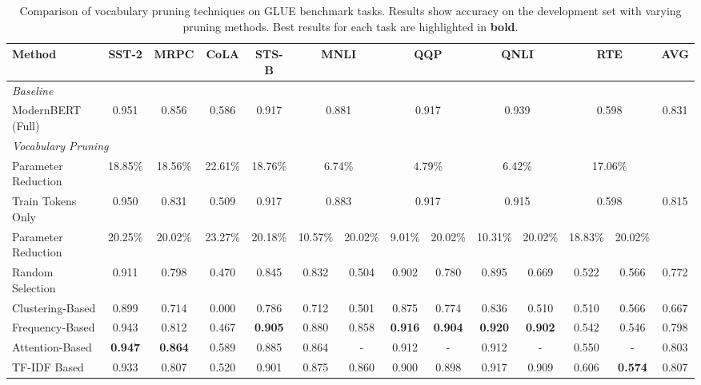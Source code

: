 \documentclass[twocolumn]{article}
\begin{document}
\begin{table*}[h]
\centering
\scriptsize
\caption{Comparison of vocabulary pruning techniques on GLUE benchmark tasks. Results show accuracy on the development set with varying pruning methods. Best results for each task are highlighted in \textbf{bold}.}
\label{tab:results}
\setlength{\tabcolsep}{2.8pt}
\begin{tabular}{lcccc|cc|cc|cc|cc|c}
\toprule
\textbf{Method} & \textbf{SST-2} & \textbf{MRPC} & \textbf{CoLA} & \textbf{STS-B} & \multicolumn{2}{c|}{\textbf{MNLI}} & \multicolumn{2}{c|}{\textbf{QQP}} & \multicolumn{2}{c|}{\textbf{QNLI}} & \multicolumn{2}{c|}{\textbf{RTE}} & \textbf{AVG} \\
\midrule
\multicolumn{14}{l}{\textit{Baseline}} \\
ModernBERT (Full) & 0.951 & 0.856 & 0.586 & 0.917 & \multicolumn{2}{c|}{0.881} & \multicolumn{2}{c|}{0.917} & \multicolumn{2}{c|}{0.939} & \multicolumn{2}{c|}{0.598} & 0.831 \\
\midrule
\multicolumn{14}{l}{\textit{Vocabulary Pruning}} \\
Parameter Reduction & 18.85\% & 18.56\% & 22.61\% & 18.76\% & \multicolumn{2}{c|}{6.74\%} & \multicolumn{2}{c|}{4.79\%} & \multicolumn{2}{c|}{6.42\%} & \multicolumn{2}{c|}{17.06\%} & \\
Train Tokens Only & 0.950 & 0.831 & 0.509 & 0.917 & \multicolumn{2}{c|}{0.883} & \multicolumn{2}{c|}{0.917} & \multicolumn{2}{c|}{0.915} & \multicolumn{2}{c|}{0.598} & 0.815 \\
\midrule
Parameter Reduction & 20.25\% & 20.02\% & 23.27\% & 20.18\% & 10.57\% & 20.02\% & 9.01\% & 20.02\% & 10.31\% & 20.02\% & 18.83\% & 20.02\% & \\
Random Selection & 0.911 & 0.798 & 0.470 & 0.845 & 0.832 & 0.504 & 0.902 & 0.780 & 0.895 & 0.669 & 0.522 & 0.566 & 0.772 \\
Clustering-Based & 0.899 & 0.714 & 0.000 & 0.786 & 0.712 & 0.501 & 0.875 & 0.774 & 0.836 & 0.510 & 0.510 & 0.566 & 0.667 \\
Frequency-Based & 0.943 & 0.812 & 0.467 & \textbf{0.905} & 0.880 & 0.858 & \textbf{0.916} & \textbf{0.904} & \textbf{0.920} & \textbf{0.902} & 0.542 & 0.546 & 0.798 \\
Attention-Based & \textbf{0.947} & \textbf{0.864} & 0.589 & 0.885 & 0.864 & - & 0.912 & - & 0.912 & - & 0.550 & - & 0.803 \\
TF-IDF Based & 0.933 & 0.807 & 0.520 & 0.901 & 0.875 & 0.860 & 0.900 & 0.898 & 0.917 & 0.909 & 0.606 & \textbf{0.574} & 0.807 \\

\end{tabular}
\end{table*}
\end{document}
